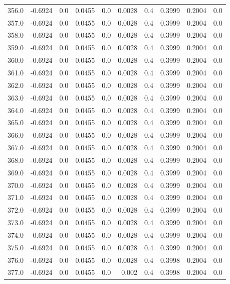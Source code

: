 \begin{longtable}{lrrrrrrrrr}
356.0 & -0.6924 & 0.0 & 0.0455 & 0.0 & 0.0028 & 0.4 & 0.3999 & 0.2004 & 0.0 \\
357.0 & -0.6924 & 0.0 & 0.0455 & 0.0 & 0.0028 & 0.4 & 0.3999 & 0.2004 & 0.0 \\
358.0 & -0.6924 & 0.0 & 0.0455 & 0.0 & 0.0028 & 0.4 & 0.3999 & 0.2004 & 0.0 \\
359.0 & -0.6924 & 0.0 & 0.0455 & 0.0 & 0.0028 & 0.4 & 0.3999 & 0.2004 & 0.0 \\
360.0 & -0.6924 & 0.0 & 0.0455 & 0.0 & 0.0028 & 0.4 & 0.3999 & 0.2004 & 0.0 \\
361.0 & -0.6924 & 0.0 & 0.0455 & 0.0 & 0.0028 & 0.4 & 0.3999 & 0.2004 & 0.0 \\
362.0 & -0.6924 & 0.0 & 0.0455 & 0.0 & 0.0028 & 0.4 & 0.3999 & 0.2004 & 0.0 \\
363.0 & -0.6924 & 0.0 & 0.0455 & 0.0 & 0.0028 & 0.4 & 0.3999 & 0.2004 & 0.0 \\
364.0 & -0.6924 & 0.0 & 0.0455 & 0.0 & 0.0028 & 0.4 & 0.3999 & 0.2004 & 0.0 \\
365.0 & -0.6924 & 0.0 & 0.0455 & 0.0 & 0.0028 & 0.4 & 0.3999 & 0.2004 & 0.0 \\
366.0 & -0.6924 & 0.0 & 0.0455 & 0.0 & 0.0028 & 0.4 & 0.3999 & 0.2004 & 0.0 \\
367.0 & -0.6924 & 0.0 & 0.0455 & 0.0 & 0.0028 & 0.4 & 0.3999 & 0.2004 & 0.0 \\
368.0 & -0.6924 & 0.0 & 0.0455 & 0.0 & 0.0028 & 0.4 & 0.3999 & 0.2004 & 0.0 \\
369.0 & -0.6924 & 0.0 & 0.0455 & 0.0 & 0.0028 & 0.4 & 0.3999 & 0.2004 & 0.0 \\
370.0 & -0.6924 & 0.0 & 0.0455 & 0.0 & 0.0028 & 0.4 & 0.3999 & 0.2004 & 0.0 \\
371.0 & -0.6924 & 0.0 & 0.0455 & 0.0 & 0.0028 & 0.4 & 0.3999 & 0.2004 & 0.0 \\
372.0 & -0.6924 & 0.0 & 0.0455 & 0.0 & 0.0028 & 0.4 & 0.3999 & 0.2004 & 0.0 \\
373.0 & -0.6924 & 0.0 & 0.0455 & 0.0 & 0.0028 & 0.4 & 0.3999 & 0.2004 & 0.0 \\
374.0 & -0.6924 & 0.0 & 0.0455 & 0.0 & 0.0028 & 0.4 & 0.3999 & 0.2004 & 0.0 \\
375.0 & -0.6924 & 0.0 & 0.0455 & 0.0 & 0.0028 & 0.4 & 0.3999 & 0.2004 & 0.0 \\
376.0 & -0.6924 & 0.0 & 0.0455 & 0.0 & 0.0028 & 0.4 & 0.3998 & 0.2004 & 0.0 \\
377.0 & -0.6924 & 0.0 & 0.0455 & 0.0 & 0.002 & 0.4 & 0.3998 & 0.2004 & 0.0 \\

\end{longtable}
